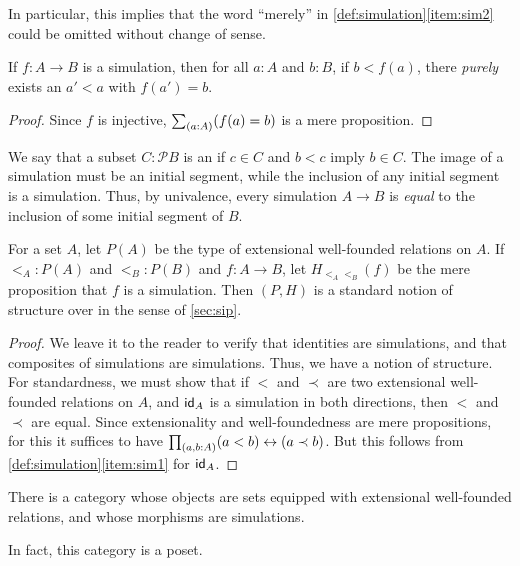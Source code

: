 In particular, this implies that the word ``merely'' in \autoref{def:simulation}\ref{item:sim2} could be omitted without change of sense.

\begin{cor}
  If $f:A\to B$ is a simulation, then for all $a:A$ and $b:B$, if $b<f(a)$, there \emph{purely} exists an $a'<a$ with $f(a')=b$.
\end{cor}
\begin{proof}
  Since $f$ is injective, $\sm{a:A} (f(a)=b)$ is a mere proposition.
\end{proof}

We say that a subset $C :\mathcal{P}B$ is an  if $c\in C$ and $b<c$ imply $b\in C$.
The image of a simulation must be an initial segment, while the inclusion of any initial segment is a simulation.
Thus, by univalence, every simulation $A\to B$ is \emph{equal} to the inclusion of some initial segment of $B$.

\begin{thm}
  For a set $A$, let $P(A)$ be the type of extensional well-founded relations on $A$.
  If $\mathord{<_A} : P(A)$ and $\mathord{<_B} : P(B)$ and $f:A\to B$, let $H_{\mathord{<_A}\mathord{<_B}}(f)$ be the mere proposition that $f$ is a simulation.
  Then $(P,H)$ is a standard notion of structure over \uset in the sense of \autoref{sec:sip}.
\end{thm}
\begin{proof}
  We leave it to the reader to verify that identities are simulations, and that composites of simulations are simulations.
  Thus, we have a notion of structure.
  For standardness, we must show that if $<$ and $\prec$ are two extensional well-founded relations on $A$, and $\idfunc[A]$ is a simulation in both directions, then $<$ and $\prec$ are equal.
  Since extensionality and well-foundedness are mere propositions, for this it suffices to have $\prd{a,b:A} (a<b) \leftrightarrow (a\prec b)$.
  But this follows from \autoref{def:simulation}\ref{item:sim1} for $\idfunc[A]$.
\end{proof}

\begin{cor}\label{thm:wfcat}
  There is a category whose objects are sets equipped with extensional well-founded relations, and whose morphisms are simulations.
\end{cor}

In fact, this category is a poset.

